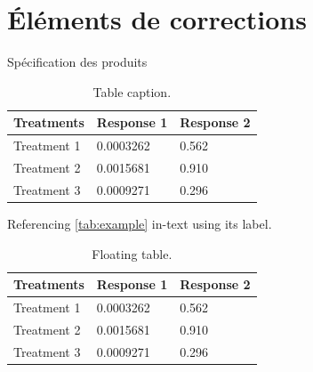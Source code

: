 \documentclass[
	11pt, %
	fleqn, %
	a4paper, %
]{LegrandOrangeBook}
\begin{document}

\chapter{Éléments de corrections}

\begin{corollary}[S6.1]
Spécification des produits
\end{corollary}

\begin{table}[H] %
	\centering %
	\begin{tabular}{L{0.15\textwidth} R{0.15\textwidth} R{0.15\textwidth}} %
		\toprule
		\textbf{Treatments} & \textbf{Response 1} & \textbf{Response 2}\\
		\midrule
		Treatment 1 & 0.0003262 & 0.562 \\
		Treatment 2 & 0.0015681 & 0.910 \\
		Treatment 3 & 0.0009271 & 0.296 \\
		\bottomrule
	\end{tabular}
	\caption{Table caption.}
	\label{tab:example} %
\end{table}

Referencing \autoref{tab:example} in-text using its label.

\begin{table}[t] %
	\centering %
	\begin{tabular}{L{0.15\textwidth} R{0.15\textwidth} R{0.15\textwidth}} %
		\toprule
		\textbf{Treatments} & \textbf{Response 1} & \textbf{Response 2}\\
		\midrule
		Treatment 1 & 0.0003262 & 0.562 \\
		Treatment 2 & 0.0015681 & 0.910 \\
		Treatment 3 & 0.0009271 & 0.296 \\
		\bottomrule
	\end{tabular}
	\caption{Floating table.}
	\label{tab:floating} %
\end{table}
\end{document}
